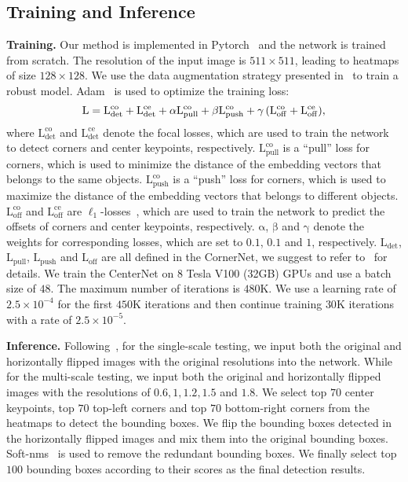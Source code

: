 \documentclass[10pt,twocolumn,letterpaper]{article}
\begin{document}
\subsection{Training and Inference }\label{Training}
\noindent\textbf{Training.} Our method is implemented in Pytorch~\cite{paszke2017automatic} and the network is trained from scratch. The resolution of the input image is $511\times511$, leading to heatmaps of size $128\times128$. We use the data augmentation strategy presented in~\cite{law2018cornernet} to train a robust model. Adam~\cite{kingma2014adam} is used to optimize the training loss:
\begin{equation} \label{loss} 
\small
\mathrm{L = L_{det}^\mathrm{co} + L_{det}^\mathrm{ce} + \alpha L_{pull}^\mathrm{co} + \beta L_{push}^\mathrm{co} + \gamma\left( L_{off}^\mathrm{co} + L_{off}^\mathrm{ce} \right)},
\end{equation}
where $\mathrm{L_{det}^\mathrm{co}}$ and $\mathrm{L_{det}^\mathrm{ce}}$ denote the focal losses, which are used to train the network to detect corners and center keypoints, respectively. $\mathrm{L_{pull}^\mathrm{co}}$ is a ``pull'' loss for corners, which is used to minimize the distance of the embedding vectors that belongs to the same objects. $\mathrm{L_{push}^\mathrm{co}}$ is a  ``push'' loss for corners, which is used to maximize the distance of the embedding vectors that belongs to different objects. $\mathrm{L_{off}^\mathrm{co}}$ and $\mathrm{L_{off}^\mathrm{ce}}$ are $\ell_1$-losses~\cite{girshick2015fast}, which are used to train the network to predict the offsets of corners and center keypoints, respectively. $\mathrm{\alpha}$, $\mathrm{\beta}$ and $\mathrm{\gamma}$ denote the weights for corresponding losses, which are set to $0.1$, $0.1$ and $1$, respectively. $\mathrm{L_{det}}$, $\mathrm{L_{pull}}$, $\mathrm{L_{push}}$ and $\mathrm{L_{off}}$ are all defined in the CornerNet, we suggest to refer to~\cite{law2018cornernet} for details. We train the CenterNet on $8$ Tesla V100 (32GB) GPUs and use a batch size of $48$. The maximum number of iterations is $480\mathrm{K}$. We use a learning rate of $2.5\times10^{-4}$ for the first $450\mathrm{K}$ iterations and then continue training $30\mathrm{K}$ iterations with a rate of $2.5\times10^{-5}$. 

\vspace{1ex}\noindent\textbf{Inference.} Following~\cite{law2018cornernet}, for the single-scale testing, we input both the original and horizontally flipped images with the original resolutions into the network. While for the multi-scale testing, we input both the original and horizontally flipped images with the resolutions of $0.6, 1, 1.2, 1.5$ and $1.8$. We select top $70$ center keypoints, top $70$ top-left corners and top $70$ bottom-right corners from the heatmaps to detect the bounding boxes. We flip the bounding boxes detected in the horizontally flipped images and mix them into the original bounding boxes. Soft-nms~\cite{bodla2017soft} is used to remove the redundant bounding boxes. We finally select top $100$ bounding boxes according to their scores as the final detection results.
\end{document}
